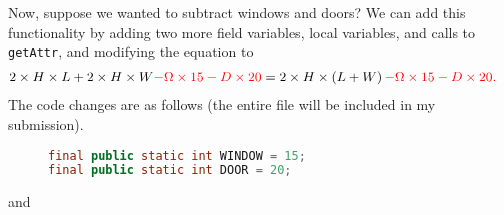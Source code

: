 \documentclass[leqno, 11pt]{article}
\begin{document}
Now, suppose we wanted to subtract windows and doors? We can add this functionality by adding two more field variables, local variables, and calls to \texttt{getAttr}, and modifying the equation to
\begin{align}
  2\times H\times L + 2\times H\times W \color{red}{- \Omega\times 15 - D\times 20}&=2\times H\times\left(L + W\right)\color{red}{- \Omega\times 15 - D\times 20}.\notag
\end{align}
The code changes are as follows (the entire file will be included in my submission).
\begin{figure}[h!]
\begin{lstlisting}[language=java,xleftmargin=0.25\textwidth]
final public static int WINDOW = 15;
final public static int DOOR = 20;
\end{lstlisting}
\end{figure}
and 
\end{document}
